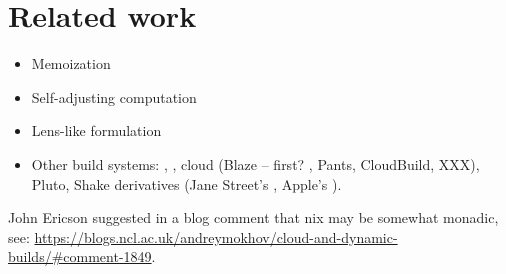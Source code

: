 \clearpage
\section{Related work}\label{sec-related}

\begin{itemize}
    \item Memoization
    \item Self-adjusting computation
    \item Lens-like formulation
    \item Other build systems: \Ninja, ,
          cloud (Blaze -- first? \Buck, Pants, CloudBuild, XXX), Pluto,
          Shake derivatives (Jane Street's , Apple's ).
\end{itemize}

John Ericson suggested in a blog comment that nix may be somewhat monadic, see:
\url{https://blogs.ncl.ac.uk/andreymokhov/cloud-and-dynamic-builds/\#comment-1849}.
